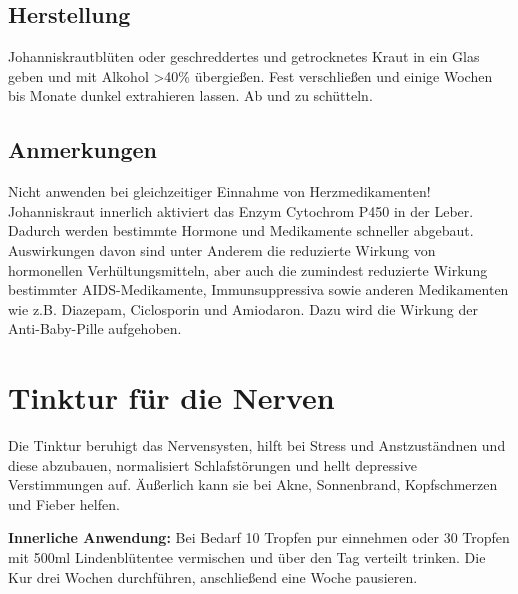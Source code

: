 \subsection{Herstellung}

Johanniskrautblüten oder geschreddertes und getrocknetes Kraut in ein Glas geben und mit Alkohol >40\% übergießen. Fest verschließen und einige Wochen bis Monate dunkel extrahieren lassen. Ab und zu schütteln.

\subsection{Anmerkungen}

Nicht anwenden bei gleichzeitiger Einnahme von Herzmedikamenten! Johanniskraut innerlich aktiviert das Enzym Cytochrom P450 in der Leber. Dadurch werden bestimmte Hormone und Medikamente schneller abgebaut. Auswirkungen davon sind unter Anderem die reduzierte Wirkung von hormonellen Verhültungsmitteln, aber auch die zumindest reduzierte Wirkung bestimmter AIDS-Medikamente, Immunsuppressiva sowie anderen Medikamenten wie z.B. Diazepam, Ciclosporin und Amiodaron. Dazu wird die Wirkung der Anti-Baby-Pille aufgehoben.



\newpage


\section{Tinktur für die Nerven}
\label{   }

\cite{nedoma2018heiltinkturen}

         



Die Tinktur beruhigt das Nervensysten, hilft bei Stress und Anstzuständnen und diese abzubauen, normalisiert Schlafstörungen und hellt depressive Verstimmungen auf. Äußerlich  kann sie bei Akne, Sonnenbrand, Kopfschmerzen und Fieber helfen.

\textbf{Innerliche Anwendung:} Bei Bedarf 10 Tropfen pur einnehmen oder 30 Tropfen mit 500ml Lindenblütentee vermischen und über den Tag verteilt trinken. Die Kur drei Wochen durchführen, anschließend eine Woche pausieren.\\ 

